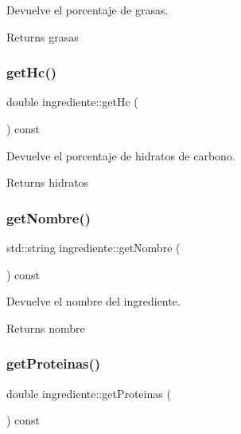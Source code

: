 Devuelve el porcentaje de grasas. 

\begin{DoxyReturn}{Returns}
grasas 
\end{DoxyReturn}
\mbox{\label{classingrediente_ae51c33e37001b7807a7b2d7bd7352355}} 
\subsubsection{\texorpdfstring{get\+Hc()}{getHc()}}
{\footnotesize\ttfamily double ingrediente\+::get\+Hc (\begin{DoxyParamCaption}{ }\end{DoxyParamCaption}) const}



Devuelve el porcentaje de hidratos de carbono. 

\begin{DoxyReturn}{Returns}
hidratos 
\end{DoxyReturn}
\mbox{\label{classingrediente_a5be2c0a0987c5e5940c44abb9135a978}} 
\subsubsection{\texorpdfstring{get\+Nombre()}{getNombre()}}
{\footnotesize\ttfamily std\+::string ingrediente\+::get\+Nombre (\begin{DoxyParamCaption}{ }\end{DoxyParamCaption}) const}



Devuelve el nombre del ingrediente. 

\begin{DoxyReturn}{Returns}
nombre 
\end{DoxyReturn}
\mbox{\label{classingrediente_a2506bbdfd9accd7247d1734838713d73}} 
\subsubsection{\texorpdfstring{get\+Proteinas()}{getProteinas()}}
{\footnotesize\ttfamily double ingrediente\+::get\+Proteinas (\begin{DoxyParamCaption}{ }\end{DoxyParamCaption}) const}



